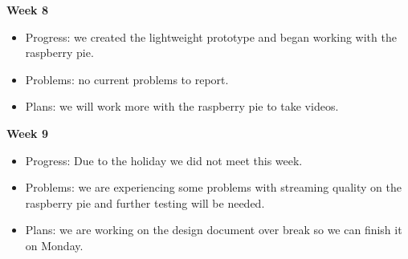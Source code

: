 \documentclass[onecolumn, draftclsnofoot,10pt, compsoc]{IEEEtran}
\begin{document}
\textbf{Week 8}
\begin{itemize}
    \item Progress: we created the lightweight prototype and began working with the raspberry pie.
    \item Problems: no current problems to report.
    \item Plans: we will work more with the raspberry pie to take videos.
\end{itemize}
\newpage
\textbf{Week 9}
\begin{itemize}
    \item Progress: Due to the holiday we did not meet this week.
    \item Problems: we are experiencing some problems with streaming quality on the raspberry pie and further testing will be needed.
    \item Plans: we are working on the design document over break so we can finish it on Monday. 
\end{itemize}
\end{document}
